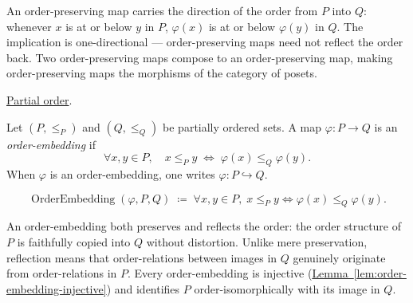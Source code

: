 \begin{remark*}[Interpretation]
An order-preserving map carries the direction of the order from $P$ into
$Q$: whenever $x$ is at or below $y$ in $P$, $\varphi(x)$ is at or below
$\varphi(y)$ in $Q$.  The implication is one-directional — order-preserving
maps need not reflect the order back.  Two order-preserving maps compose
to an order-preserving map, making order-preserving maps the morphisms
of the category of posets.
\end{remark*}

\begin{remark*}[Dependencies]
\hyperref[def:partial-order]{Partial order}.
\end{remark*}


\begin{tcolorbox}[colback=defbox, colframe=defborder, arc=2pt,
  left=6pt, right=6pt, top=4pt, bottom=4pt,
  title={\small\textbf{Definition (Order-Embedding)}},
  fonttitle=\small\bfseries]
\begin{definition}
\label{def:order-embedding}
Let $(P, \leq_P)$ and $(Q, \leq_Q)$ be partially ordered sets.  A map
$\varphi : P \to Q$ is an \emph{order-embedding} if
\[
\forall x, y \in P, \quad
x \leq_P y \;\Longleftrightarrow\; \varphi(x) \leq_Q \varphi(y).
\]
When $\varphi$ is an order-embedding, one writes $\varphi : P \hookrightarrow Q$.
\end{definition}
\end{tcolorbox}

\begin{remark*}
\[
\operatorname{OrderEmbedding}(\varphi, P, Q)
\;\coloneqq\;
\forall x, y \in P,\;
x \leq_P y \Longleftrightarrow \varphi(x) \leq_Q \varphi(y).
\]
\end{remark*}

\begin{remark*}[Interpretation]
An order-embedding both preserves and reflects the order: the order
structure of $P$ is faithfully copied into $Q$ without distortion.
Unlike mere preservation, reflection means that order-relations between
images in $Q$ genuinely originate from order-relations in $P$.  Every
order-embedding is injective
(\hyperref[lem:order-embedding-injective]{Lemma~\ref*{lem:order-embedding-injective}})
and identifies $P$ order-isomorphically with its image in $Q$.
\end{remark*}

